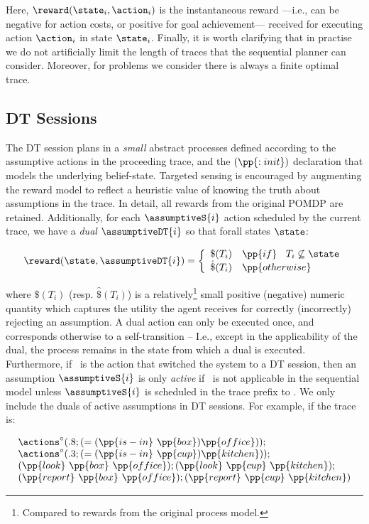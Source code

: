 \noindent  Here,  $\reward(\state_i, \action_i)$ is the instantaneous
reward ---i.e., can be negative for action costs, or positive for goal
achievement--- received for executing action $\action_i$ in state
$\state_i$. Finally, it is worth clarifying that in practise we do not
artificially limit the length of traces that the sequential planner
can consider. Moreover, for problems we consider there is always a
finite optimal trace.


\subsection{DT Sessions}

The DT session plans in a {\em small} abstract processes defined
according to the assumptive actions in the proceeding trace, and the
$(\pp{:init})$ declaration that models the underlying
belief-state. Targeted sensing is encouraged by augmenting the reward
model to reflect a heuristic value of knowing the truth about
assumptions in the trace. In detail, all rewards from the original
POMDP are retained. Additionally, for each $\assumptiveS{i}$ action
scheduled by the current trace, we have a {\em dual}
$\assumptiveDT{i}$ so that forall states $\state$:

\small
\[
\reward(\state, \assumptiveDT{i}) = \bigg\{ \begin{array}{ll}
\$(T_i) & \pp{if}~\;\;T_i \not\subseteq \state \\
\hat\$(T_i) & \pp{otherwise} \\
\end{array}
\]
\normalsize

\noindent where $\$(T_i)$ (resp. $\hat\$(T_i)$) is a 
relatively\footnote{Compared to rewards from the original process
model.} small positive (negative) numeric quantity which captures the
utility the agent receives for correctly (incorrectly) rejecting an
assumption. A dual action can only be executed once, and corresponds
otherwise to a self-transition -- I.e., except in the applicability of
the dual, the process remains in the state from which a dual is
executed.
Furthermore, if \switchAction\ is the action that switched the system
to a DT session, then an assumption $\assumptiveS{i}$ is only {\em
active} if
\switchAction\ is not applicable in the sequential model unless
$\assumptiveS{i}$ is scheduled in the trace prefix
to \switchAction. We only include the duals of active assumptions in
DT sessions. For example, if the trace is:

\small
\[
\begin{array}{l}
\actions^{\circ}(.8;(=(\pp{is-in}~\pp{box})\pp{office}));\\
\actions^{\circ}(.3;(=(\pp{is-in}~\pp{cup})\pp{kitchen}));\\
(\pp{look}~\pp{box}~\pp{office});
(\pp{look}~\pp{cup}~\pp{kitchen});\\
(\pp{report}~\pp{box}~\pp{office}); 
(\pp{report}~\pp{cup}~\pp{kitchen})
\end{array}
\]
\normalsize

